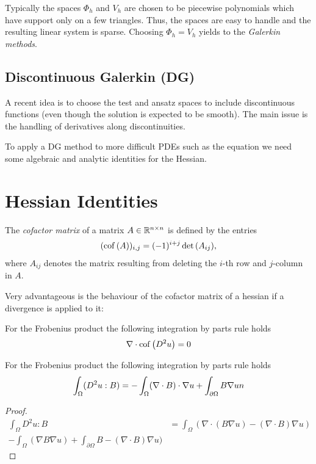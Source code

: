 Typically the spaces $\Phi_h$ and $V_h$ are chosen to be piecewise polynomials which have support only on a few triangles. Thus, the spaces are easy to handle and the resulting linear system is sparse.
Choosing $\Phi_h = V_h$ yields to the \emph{Galerkin methods}.

\subsection{Discontinuous Galerkin (DG)}
A recent idea is to choose the test and ansatz spaces to include discontinuous functions (even though the solution is expected to be smooth).
The main issue is the handling of derivatives along discontinuities.

\newpage

To apply a DG method to more difficult PDEs such as the \MA equation we need some algebraic and analytic identities for the Hessian.
\section{Hessian Identities}

\begin{definition} \label{def: cof matrix}
	The \emph{cofactor matrix} of a matrix $A \in \mathbb{R}^{n \times n}$ is defined by the entries
	\begin{align}
	(\operatorname{cof} \left( A \right) )_{i,j} = (-1)^{i+j} \det{\left(A_{ij}\right)},
	\end{align}
	where $A_{ij}$ denotes the matrix resulting from deleting the $i$-th row and $j$-column in $A$.
	
\end{definition}

Very advantageous is the behaviour of the cofactor matrix of a hessian if a divergence is applied to it:
\begin{lemma} \label{la: divergence free cof}
For the Frobenius product the following integration by parts rule holds
\[
	\nabla \cdot \operatorname{cof} \left( D^2 u \right) = 0
\] 
\end{lemma}

\begin{lemma} \label{la: integration by parts Frobenius}
For the Frobenius product the following integration by parts rule holds
\[
	\int_\Omega (D^2 u : B) = - \int_\Omega (\nabla \cdot B) \cdot \nabla u + \int_{\partial \Omega}  B \nabla u \boldmath n
\] 
\end{lemma}

\begin{proof}
\begin{align*}
\int_\Omega D^2 u : B &= \int_{\Omega}( \nabla \cdot (B \nabla u ) - (\nabla \cdot B) \nabla u) \\
									     -\int_{\Omega}( \nabla B \nabla u )  + \int_{\partial \Omega} B- (\nabla \cdot B) \nabla u) 
\end{align*}
\end{proof}
